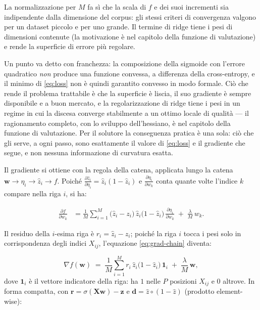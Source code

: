 La normalizzazione per $M$ fa sì che la scala di $f$ e dei suoi incrementi
sia indipendente dalla dimensione del corpus: gli stessi criteri di
convergenza valgono per un dataset piccolo e per uno grande. Il termine di
ridge tiene i pesi di dimensioni contenute (la motivazione è nel capitolo
della funzione di valutazione) e rende la superficie di errore più regolare.

Un punto va detto con franchezza: la composizione della sigmoide con
l'errore quadratico \emph{non} produce una funzione convessa, a differenza
della cross-entropy, e il minimo di \eqref{eq:loss} non è quindi garantito
convesso in modo formale. Ciò che rende il problema trattabile è che la
superficie è liscia, il suo gradiente è sempre disponibile e a buon mercato,
e la regolarizzazione di ridge tiene i pesi in un regime in cui la discesa
converge stabilmente a un ottimo locale di qualità — il ragionamento
completo, con lo sviluppo dell'hessiano, è nel capitolo della funzione di
valutazione. Per il solutore la conseguenza pratica è una sola: ciò che gli
serve, a ogni passo, sono esattamente il valore di \eqref{eq:loss} e il
gradiente che segue, e non nessuna informazione di curvatura esatta.

Il gradiente si ottiene con la regola della catena, applicata lungo la catena
$\bm{w} \to \eta_i \to \hat z_i \to f$. Poiché
$\frac{\partial \hat z_i}{\partial \eta_i} = \hat z_i(1-\hat z_i)$ e
$\frac{\partial \eta_i}{\partial w_k}$ conta quante volte l'indice $k$
compare nella riga $i$, si ha:

\begin{align}
  \frac{\partial f}{\partial w_k}
  &= \frac{1}{M}\sum_{i=1}^{M}
     \bigl(\hat z_i - z_i\bigr)\,\hat z_i\bigl(1-\hat z_i\bigr)\,
     \frac{\partial \eta_i}{\partial w_k}
  \;+\; \frac{\lambda}{M}\,w_k .
  \label{eq:grad-chain}
\end{align}

Il residuo della $i$-esima riga è $r_i = \hat z_i - z_i$; poiché la riga $i$
tocca i pesi solo in corrispondenza degli indici $X_{ij}$,
l'equazione \eqref{eq:grad-chain} diventa:

\begin{equation}
  \nabla f(\bm{w}) \;=\;
  \frac{1}{M}\sum_{i=1}^{M}
  r_i\,\hat z_i\bigl(1-\hat z_i\bigr)\,\mathbf{1}_i
  \;+\; \frac{\lambda}{M}\,\bm{w} ,
  \label{eq:gradient}
\end{equation}
dove $\mathbf{1}_i$ è il vettore indicatore della riga: ha $1$ nelle $P$
posizioni $X_{ij}$ e $0$ altrove. In forma compatta, con
$\bm{r} = \sigma(\bm{Xw}) - \bm{z}$ e $\bm{d} = \hat z \circ (1 - \hat z)$
(prodotto element-wise):

